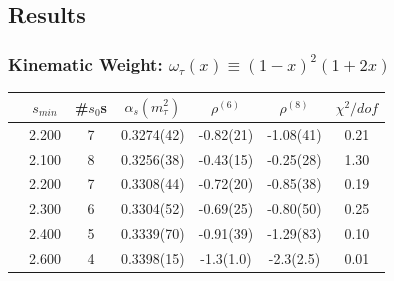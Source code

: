 \documentclass{beamer}
\begin{document}
\subsection{Results}
\begin{frame}
  \frametitle{Kinematic Weight: \(\omega_\tau(x) \equiv (1-x)^2(1+2x)\)}
  \centering
  \begin{tabular}{ccccccc}
    \toprule
    & \(s_{min}\) & \#\(s_0\)s & \(\alpha_s(m_\tau^2)\) & \(\rho^{(6)}\) & \(\rho^{(8)}\) & \(\chi^2/dof\)  \\
    \midrule
    \parbox[t]{2mm}{}
    & 2.200 & 7 & 0.3274(42) & -0.82(21) & -1.08(41) & 0.21 \\
    \midrule
    \parbox[t]{2mm}{}
    & 2.100 & 8 & 0.3256(38) & -0.43(15) & -0.25(28) & 1.30 \\
    & 2.200 & 7 & 0.3308(44) & -0.72(20) & -0.85(38) & 0.19 \\
    & 2.300 & 6 & 0.3304(52) & -0.69(25) & -0.80(50) & 0.25 \\
    & 2.400 & 5 & 0.3339(70) & -0.91(39) & -1.29(83) & 0.10 \\
    & 2.600 & 4 & 0.3398(15) & -1.3(1.0) & -2.3(2.5) & 0.01  \\
    \bottomrule
  \end{tabular}
\end{frame}
\end{document}
